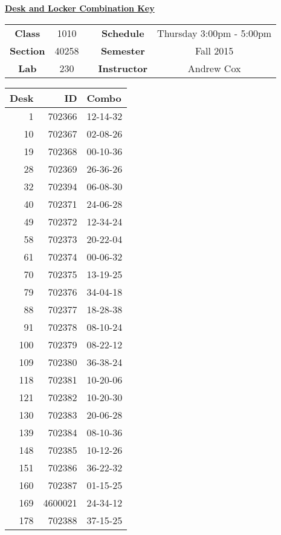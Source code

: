 \documentclass[12pt]{article}
\begin{document}
\thispagestyle{empty}

\begin{center}
	{\huge\textbf{\underline{ Desk and Locker Combination Key}}}
\end{center}


\begin{table}[h]
  \centering
  \begin{tabular}{ccccc}

  \textbf{Class} & 1010 & {\qquad} &\textbf{Schedule} & Thursday 3:00pm - 5:00pm \\
  \textbf{Section} & 40258 & {\qquad} & \textbf{Semester} & Fall 2015 \\
  \textbf{Lab} & 230 & {\qquad} & \textbf{Instructor} & Andrew Cox \\
  \end{tabular}
\end{table}
 \vspace{0.5in}
\begin{minipage}{0.4\textwidth}

\begin{tabular}{rrl}
\toprule
 Desk &       ID &     Combo \\
\midrule
    1 &   702366 &  12-14-32 \\
   10 &   702367 &  02-08-26 \\
   19 &   702368 &  00-10-36 \\
   28 &   702369 &  26-36-26 \\
   32 &   702394 &  06-08-30 \\
   40 &   702371 &  24-06-28 \\
   49 &   702372 &  12-34-24 \\
   58 &   702373 &  20-22-04 \\
   61 &   702374 &  00-06-32 \\
   70 &   702375 &  13-19-25 \\
   79 &   702376 &  34-04-18 \\
   88 &   702377 &  18-28-38 \\
   91 &   702378 &  08-10-24 \\
  100 &   702379 &  08-22-12 \\
  109 &   702380 &  36-38-24 \\
  118 &   702381 &  10-20-06 \\
  121 &   702382 &  10-20-30 \\
  130 &   702383 &  20-06-28 \\
  139 &   702384 &  08-10-36 \\
  148 &   702385 &  10-12-26 \\
  151 &   702386 &  36-22-32 \\
  160 &   702387 &  01-15-25 \\
  169 &  4600021 &  24-34-12 \\
  178 &   702388 &  37-15-25 \\
\bottomrule
\end{tabular}


\end{minipage}
\end{document}
